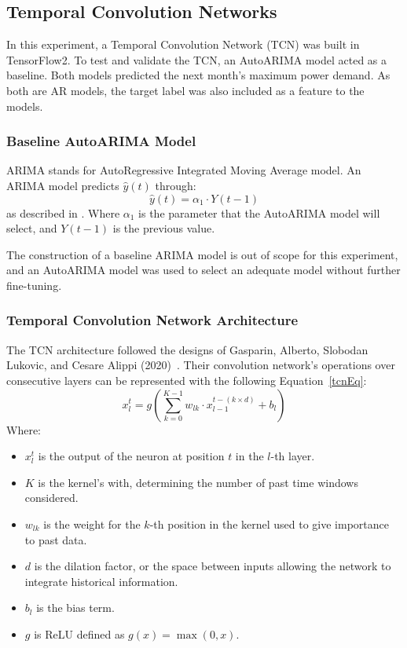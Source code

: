 \documentclass{ieeeaccess}
\begin{document}
\subsection{Temporal Convolution Networks} \label{TCNarch}

In this experiment, a Temporal Convolution Network (TCN) was built in TensorFlow2. To test and validate the TCN, an AutoARIMA model acted as a baseline. Both models predicted the next month's maximum power demand. As both are AR models, the target label was also included as a feature to the models.

\subsubsection{Baseline AutoARIMA Model}

ARIMA stands for AutoRegressive Integrated Moving Average model. An ARIMA model predicts \( \hat{y}(t) \) through:
\begin{equation} 
\hat{y}(t) = \alpha_1 \cdot Y(t-1)
\label{eq:arima}
\end{equation}
as described in \cite{Zhang2018}. Where $\alpha_1$ is the parameter that the AutoARIMA model will select, and $Y(t-1)$ is the previous value.

The construction of a baseline ARIMA model is out of scope for this experiment, and an AutoARIMA model was used to select an adequate model without further fine-tuning. 

\subsubsection{Temporal Convolution Network Architecture}

The TCN architecture followed the designs of Gasparin, Alberto, Slobodan Lukovic, and Cesare Alippi (2020)~\cite{Gasparin2022}. Their convolution network's operations over consecutive layers can be represented with the following Equation~\ref{tcnEq}:
\begin{equation} \label{tcnEq}
x_{l}^{t} = g\left(\sum_{k=0}^{K-1} w_{lk} \cdot x_{l-1}^{t-(k \times d)} + b_l\right)
\end{equation}
Where:
\begin{itemize}
    \item \( x_{l}^{t} \) is the output of the neuron at position \( t \) in the \( l \)-th layer.
    \item \( K \) is the kernel's with, determining the number of past time windows considered.
    \item \( w_{lk} \) is the weight for the \( k \)-th position in the kernel used to give importance to past data.
    \item \( d \) is the dilation factor, or the space between inputs allowing the network to integrate historical information.
    \item \( b_l \) is the bias term.
    \item \( g \) is ReLU defined as \( g(x) = \max(0, x) \).
\end{itemize}
\end{document}
